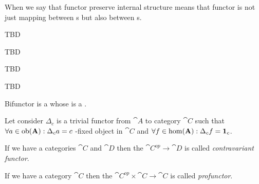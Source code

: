 \begin{remark}[Functor]
When we say that functor preserve internal structure means that
functor is not just mapping between s but also
between s.  
\end{remark}

\begin{definition}
TBD
\end{definition}

\begin{definition}
TBD
\end{definition}

\begin{definition}
TBD
\end{definition}

\begin{definition}
\label{def:category_product}
TBD
\end{definition}

\begin{definition}[Bifunctor]
\label{def:bifunctor}
Bifunctor is a  whose  is
a . 
\end{definition}

\begin{definition}
\label{def:terminal_object_cat}
Let consider $\Delta_c$ is a trivial functor from 
$\cat{A}$ to category $\cat{C}$ such that $\forall a \in \mathrm{ob}(\mathbf{A}):
\Delta_c a = c$ -fixed object in $\cat{C}$ and 
$\forall f \in \mathrm{hom}(\mathbf{A}): \Delta_c f = \mathbf{1}_{ c }$.
\end{definition}

\begin{definition}
\label{def:contravariant_functor}
If we have a categories $\cat{C}$ and $\cat{D}$ then the
 $\cat{C^{op}} \to \cat{D}$ is called
\textit{contravariant functor}. 
\end{definition}

\begin{definition}[Profunctor]
\label{def:profunctor}
If we have a category $\cat{C}$ then the 
$\cat{C^{op}} \times \cat{C} \to \cat{C}$ is called
\textit{profunctor}. 
\end{definition}

